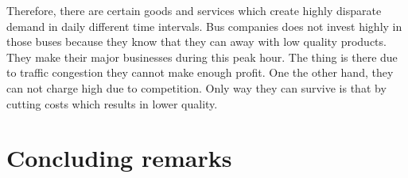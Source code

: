 \documentclass[
  11pt,
]{article}
\begin{document}
Therefore, there are certain goods and services which create highly
disparate demand in daily different time intervals. Bus companies does
not invest highly in those buses because they know that they can away
with low quality products. They make their major businesses during this
peak hour. The thing is there due to traffic congestion they cannot make
enough profit. One the other hand, they can not charge high due to
competition. Only way they can survive is that by cutting costs which
results in lower quality.

\hypertarget{concluding-remarks}{%
\section{Concluding remarks}\label{concluding-remarks}}

\printbibliography[title=References]
\end{document}
